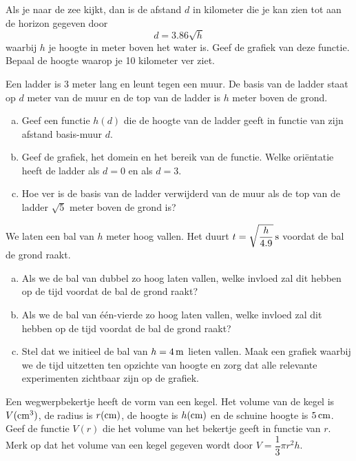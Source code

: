 \documentclass[12pt,twoside]{article}
\begin{document}
\begin{oefening} %
Als je naar de zee kijkt, dan is de afstand $d$ in kilometer die je kan zien tot aan de horizon gegeven door
$$d=3.86\sqrt{h}$$
waarbij $h$ je hoogte in meter boven het water is. Geef de grafiek van deze functie. Bepaal de hoogte waarop je 10 kilometer ver ziet.
\end{oefening}

\begin{oefening} %
Een ladder is 3 meter lang en leunt tegen een muur. De basis van de ladder staat op $d$ meter van de muur en de top van de ladder is $h$ meter boven de grond.
\begin{enumerate}[(a)]
  \item Geef een functie $h(d)$ die de hoogte van de ladder geeft in functie van zijn afstand basis-muur $d$.
  \item Geef de grafiek, het domein en het bereik van de functie. Welke oriëntatie heeft de ladder als $d=0$ en als $d=3$.
  \item Hoe ver is de basis van de ladder verwijderd van de muur als de top van de ladder $\sqrt{5}$ meter boven de grond is?
\end{enumerate}
\end{oefening}

\begin{oefening} %
We laten een bal van $h$ meter hoog vallen. Het duurt $t=\sqrt{\dfrac{h}{4.9}}\s$ voordat de bal de grond raakt.
\begin{enumerate}[(a)]
  \item Als we de bal van dubbel zo hoog laten vallen, welke invloed zal dit hebben op de tijd voordat de bal de grond raakt?
  \item Als we de bal van één-vierde zo hoog laten vallen, welke invloed zal dit hebben op de tijd voordat de bal de grond raakt?
  \item Stel dat we initieel de bal van $h=4\m$ lieten vallen. Maak een grafiek waarbij we de tijd uitzetten ten opzichte van hoogte en zorg dat alle relevante experimenten zichtbaar zijn op de grafiek.
\end{enumerate}
\end{oefening}

\begin{oefening} %
Een wegwerpbekertje heeft de vorm van een kegel. Het volume van de kegel is $V (\cm^3)$, de radius is $r (\cm)$, de hoogte is $h (\cm)$ en de schuine hoogte is $5 \cm$. Geef de functie $V(r)$ die het volume van het bekertje geeft in functie van $r$. Merk op dat het volume van een kegel gegeven wordt door $V=\dfrac{1}{3}\pi r^2 h$.
\end{oefening}
\end{document}
